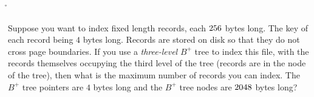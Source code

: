 



\ADD{}\p
\DIVIDE{}\q
\FLOOR\q\r
\DIVIDE\va\vb\s

\question[4] Suppose you want to index fixed length records,
each $256$ bytes long. The key of each record being $4$ bytes
long. Records are stored on disk so that they do not cross
page boundaries. If you use a \textit{three-level} $B^{+}$ tree 
to index this file, with the records themselves occupying the 
third level of the tree (records are in the node of the tree), 
then what is the maximum number of records you can index. The 
$B^{+}$ tree pointers are $4$ bytes long and the $B^{+}$ tree
nodes are $2048$ bytes long?

